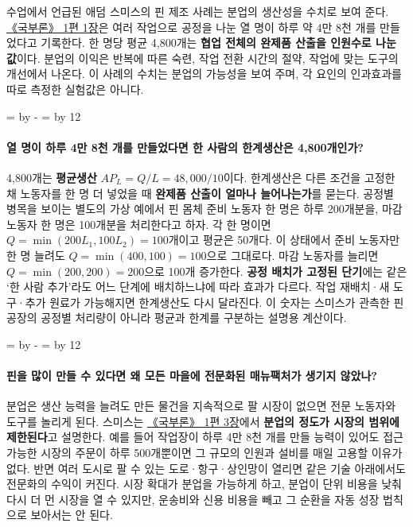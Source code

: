 \documentclass[10pt,a4paper]{article}
\newcommand{\ReserveQuestionSpace}{%
  \par\begingroup
  \dimen0=\pagegoal \advance\dimen0 by -\pagetotal
  \dimen2=\baselineskip \multiply\dimen2 by 12
  \ifdim\dimen0<\dimen2 \newpage\fi
  \endgroup}
\begin{document}
수업에서 언급된 애덤 스미스의 핀 제조 사례는 분업의 생산성을 수치로 보여 준다. \href{https://oll.libertyfund.org/titles/smith-an-inquiry-into-the-nature-and-causes-of-the-wealth-of-nations-cannan-ed-vol-1}{《국부론》 1편 1장}은 여러 작업으로 공정을 나눈 열 명이 하루 약 4만 8천 개를 만들었다고 기록한다. 한 명당 평균 4,800개는 \textbf{협업 전체의 완제품 산출을 인원수로 나눈 값}이다. 분업의 이익은 반복에 따른 숙련, 작업 전환 시간의 절약, 작업에 맞는 도구의 개선에서 나온다. 이 사례의 수치는 분업의 가능성을 보여 주며, 각 요인의 인과효과를 따로 측정한 실험값은 아니다.\par

\ReserveQuestionSpace
\paragraph{열 명이 하루 4만 8천 개를 만들었다면 한 사람의 한계생산은 4,800개인가?}
4,800개는 \textbf{평균생산} $AP_L=Q/L=48{,}000/10$이다. 한계생산은 다른 조건을 고정한 채 노동자를 한 명 더 넣었을 때 \textbf{완제품 산출이 얼마나 늘어나는가}를 묻는다. 공정별 병목을 보이는 별도의 가상 예에서 핀 몸체 준비 노동자 한 명은 하루 200개분을, 마감 노동자 한 명은 100개분을 처리한다고 하자. 각 한 명이면 $Q=\min(200L_1,100L_2)=100$개이고 평균은 50개다. 이 상태에서 준비 노동자만 한 명 늘려도 $Q=\min(400,100)=100$으로 그대로다. 마감 노동자를 늘리면 $Q=\min(200,200)=200$으로 100개 증가한다. \textbf{공정 배치가 고정된 단기}에는 같은 ‘한 사람 추가’라도 어느 단계에 배치하느냐에 따라 효과가 다르다. 작업 재배치·새 도구·추가 원료가 가능해지면 한계생산도 다시 달라진다. 이 숫자는 스미스가 관측한 핀 공장의 공정별 처리량이 아니라 평균과 한계를 구분하는 설명용 계산이다.\par

\ReserveQuestionSpace
\paragraph{핀을 많이 만들 수 있다면 왜 모든 마을에 전문화된 매뉴팩처가 생기지 않았나?}
분업은 생산 능력을 늘려도 만든 물건을 지속적으로 팔 시장이 없으면 전문 노동자와 도구를 놀리게 된다. 스미스는 \href{https://oll.libertyfund.org/titles/smith-an-inquiry-into-the-nature-and-causes-of-the-wealth-of-nations-cannan-ed-vol-1}{《국부론》 1편 3장}에서 \textbf{분업의 정도가 시장의 범위에 제한된다}고 설명한다. 예를 들어 작업장이 하루 4만 8천 개를 만들 능력이 있어도 접근 가능한 시장의 주문이 하루 500개뿐이면 그 규모의 인원과 설비를 매일 고용할 이유가 없다. 반면 여러 도시로 팔 수 있는 도로·항구·상인망이 열리면 같은 기술 아래에서도 전문화의 수익이 커진다. 시장 확대가 분업을 가능하게 하고, 분업이 단위 비용을 낮춰 다시 더 먼 시장을 열 수 있지만, 운송비와 신용 비용을 빼고 그 순환을 자동 성장 법칙으로 보아서는 안 된다.\par
\end{document}
